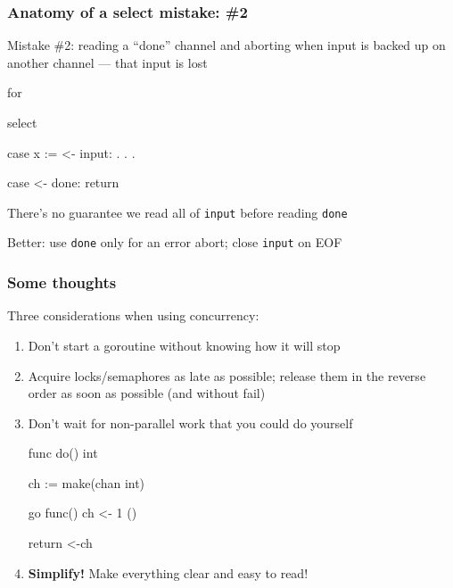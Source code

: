 \documentclass[handout,compress,t,11pt]{beamer}
\begin{document}
\begin{frame}[fragile]
    \frametitle{Anatomy of a select mistake: \#2}
    Mistake \#2: reading a ``done'' channel and aborting when input is backed 
    up on another channel --- that input is lost \par
\begin{golang}
for {
    select {
    case x := <- input:
        . . .

    case <- done:
        return
    }
}
\end{golang}
    \vspace{0.6\baselineskip}
There's no guarantee we read all of \verb|input| before reading \verb|done| \par
    \vspace{0.6\baselineskip}
Better: use \verb|done| only for an error abort; close \verb|input| on EOF
\end{frame}

\begin{frame}[fragile]
    \frametitle{Some thoughts}
    Three considerations when using concurrency:
    \begin{enumerate}
    \item Don't start a goroutine without knowing how it will stop \par
        \vspace{0.6\baselineskip}
    \item Acquire locks/semaphores as late as possible; release them in
          the reverse order as soon as possible (and without fail)
        \vspace{0.6\baselineskip}
    \item Don't wait for non-parallel work that you could do yourself 
\begin{golang}
func do() int {
    ch := make(chan int)

    go func() { ch <- 1 }()

    return <-ch
}
\end{golang}
        \vspace{0.6\baselineskip}
    \item {\bf Simplify!} Make everything clear and easy to read!
    \end{enumerate}
\end{frame}
\end{document}
